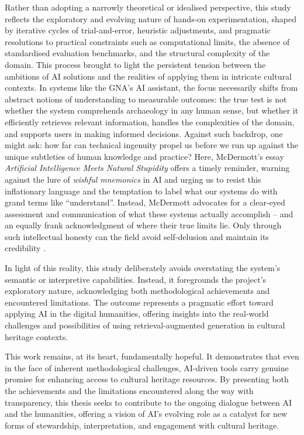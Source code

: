 \begin{spacing}{1.5}
Rather than adopting a narrowly theoretical or idealised perspective, this study reflects the exploratory and evolving nature of hands-on experimentation, shaped by iterative cycles of trial-and-error, heuristic adjustments, and pragmatic resolutions to practical constraints such as computational limits, the absence of standardised evaluation benchmarks, and the structural complexity of the domain. This process brought to light the persistent tension between the ambitions of AI solutions and the realities of applying them in intricate cultural contexts. In systems like the GNA’s AI assistant, the focus necessarily shifts from abstract notions of understanding to measurable outcomes: the true test is not whether the system comprehends archaeology in any human sense, but whether it efficiently retrieves relevant information, handles the complexities of the domain, and supports users in making informed decisions. Against such backdrop, one might ask: how far can technical ingenuity propel us before we run up against the unique subtleties of human knowledge and practice? Here, McDermott’s essay \textit{Artificial Intelligence Meets Natural Stupidity} offers a timely reminder, warning against the lure of \textit{wishful mnemonics} in AI and urging us to resist this inflationary language and the temptation to label what our systems do with grand terms like ``understand''. Instead, McDermott advocates for a clear-eyed assessment and communication of what these systems actually accomplish -- and an equally frank acknowledgment of where their true limits lie. Only through such intellectual honesty can the field avoid self-delusion and maintain its credibility \citep{mcdermott_artificial_1976}.

In light of this reality, this study deliberately avoids overstating the system’s semantic or interpretive capabilities. Instead, it foregrounds the project’s exploratory nature, acknowledging both methodological achievements and encountered limitations. The outcome represents a pragmatic effort toward applying AI in the digital humanities, offering insights into the real-world challenges and possibilities of using retrieval-augmented generation in cultural heritage contexts.

This work remains, at its heart, fundamentally hopeful. It demonstrates that even in the face of inherent methodological challenges, AI-driven tools carry genuine promise for enhancing access to cultural heritage resources. By presenting both the achievements and the limitations encountered along the way with transparency, this thesis seeks to contribute to the ongoing dialogue between AI and the humanities, offering a vision of AI’s evolving role as a catalyst for new forms of stewardship, interpretation, and engagement with cultural heritage.

\end{spacing}
